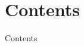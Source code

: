 

\begin{frame}
  \maketitle
\end{frame}

\section*{Contents}

\begin{frame}{Contents}
  \tableofcontents
\end{frame}



\appendix



\endinput
